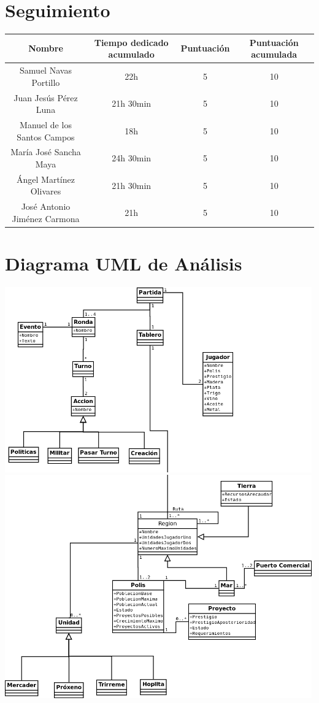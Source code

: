 \documentclass[11 pt]{book}
\begin{document}
	\section{Seguimiento}
		\begin{tabular}{|c|c|c|c|}
			\hline
			Nombre & Tiempo dedicado acumulado & Puntuación & Puntuación acumulada\\
			\hline
			Samuel Navas Portillo & 22h & 5 & 10\\
			Juan Jesús Pérez Luna & 21h 30min & 5 & 10\\
			Manuel de los Santos Campos & 18h & 5 & 10\\
			María José Sancha Maya & 24h 30min & 5 & 10\\
			Ángel Martínez Olivares & 21h 30min & 5 & 10\\
			José Antonio Jiménez Carmona & 21h & 5 & 10\\
			\hline
		\end{tabular}

	\section{Diagrama UML de Análisis}
		\begin{center}
			\includegraphics[width=500px]{analysis-uml/iteration2/part1.png}
			\includegraphics[width=500px]{analysis-uml/iteration2/part2.png}
		\end{center}
		
\end{document}
